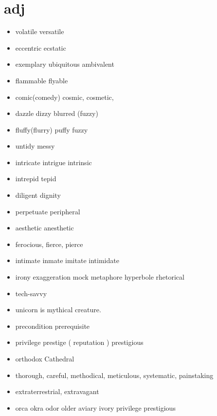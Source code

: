 \documentclass[a4paper,11pt,twoside]{book}
\begin{document}
\section{adj}
\begin{itemize}
	\item volatile versatile
	
	\item eccentric ecstatic 
	
	\item exemplary ubiquitous ambivalent
	
	\item flammable flyable
	
	\item comic(comedy) cosmic, cosmetic,  
	
	\item dazzle dizzy blurred (fuzzy) 
	
	\item fluffy(flurry) puffy fuzzy
	
	\item untidy messy
	
	\item intricate intrigue intrinsic
	
	\item intrepid tepid 
	
	\item diligent dignity
	
	\item perpetuate peripheral
	
	\item aesthetic anesthetic
	
	\item ferocious, fierce, pierce
	
	\item intimate inmate imitate intimidate
	
	\item irony exaggeration mock metaphore hyperbole rhetorical
	
	\item tech-savvy
	
	\item unicorn is mythical creature.
	
	\item precondition prerequisite
	
	\item privilege prestige ( reputation ) prestigious
	
	\item orthodox Cathedral
	
	\item thorough, careful, methodical, meticulous, systematic, painstaking
	
	\item extraterrestrial, extravagant 
	
	\item orca okra
	odor older aviary ivory privilege prestigious
	
\end{itemize}
\end{document}
